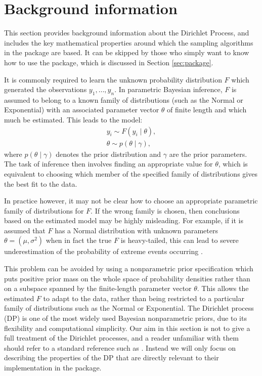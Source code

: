 \documentclass[nojss]{jss}
\begin{document}
\section{Background information}
\label{sec:background}

This section provides background information about the Dirichlet Process, and includes the key mathematical properties around which the sampling algorithms in the  package are based. It can be skipped by those who simply want to know how to use the package, which is discussed in Section  \ref{sec:package}.


It is commonly required to learn the unknown probability distribution $F$ which generated the observations $y_1,\ldots,y_n$. In parametric Bayesian inference, $F$ is assumed to belong to a known family of distributions (such as the Normal or Exponential) with an associated parameter vector $\theta$ of finite length and which much be estimated. This leads to the model:
\begin{align*}
y_i \sim F(y_i \mid \theta), \\
\theta \sim p(\theta \mid \gamma),
\end{align*}
where $p(\theta \mid \gamma)$ denotes the prior distribution and $\gamma$ are the prior parameters. The task of inference then involves finding an appropriate value for $\theta$, which is equivalent to choosing which member of the specified family of distributions gives the best fit to the data.

In practice however, it may not be clear how to choose an appropriate parametric family of distributions for $F$. If the wrong family is chosen, then conclusions based on the estimated model may be highly misleading. For example, if it is assumed that $F$ has a Normal distribution with unknown parameters $\theta=(\mu,\sigma^2)$ when in fact the true $F$ is heavy-tailed, this can lead to severe underestimation of the probability of extreme events occurring \citep{coles_introduction_2001}.

This problem can be avoided by using a nonparametric prior specification which puts positive prior mass on the whole space of probability densities rather than on a subspace spanned by the finite-length parameter vector $\theta$. This allows the estimated $F$ to adapt to the data, rather than being restricted to a particular family of distributions such as the Normal or Exponential. The Dirichlet process (DP) is one of the most widely used Bayesian nonparametric priors, due to its flexibility and computational simplicity. Our aim in this section is not to give a full treatment of the Dirichlet processes, and a reader unfamiliar with them should refer to a standard reference such as \cite{escobar_bayesian_1995}. Instead we will only focus on describing the properties of the DP that are directly relevant to their implementation in the  package.
\end{document}
